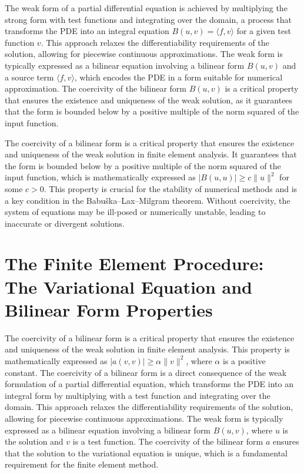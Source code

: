 \documentclass[12pt, a4paper]{article}
\begin{document}
The weak form of a partial differential equation is achieved by multiplying the strong form with test functions and integrating over the domain, a process that transforms the PDE into an integral equation \(B(u, v) = \langle f, v \rangle\) for a given test function \(v\). This approach relaxes the differentiability requirements of the solution, allowing for piecewise continuous approximations. The weak form is typically expressed as a bilinear equation involving a bilinear form \(B(u, v)\) and a source term \(\langle f, v \rangle\), which encodes the PDE in a form suitable for numerical approximation. The coercivity of the bilinear form \(B(u, v)\) is a critical property that ensures the existence and uniqueness of the weak solution, as it guarantees that the form is bounded below by a positive multiple of the norm squared of the input function.

The coercivity of a bilinear form is a critical property that ensures the existence and uniqueness of the weak solution in finite element analysis. It guarantees that the form is bounded below by a positive multiple of the norm squared of the input function, which is mathematically expressed as \(|B(u, u)| \geq c\|u\|^2\) for some \(c > 0\). This property is crucial for the stability of numerical methods and is a key condition in the Babuška–Lax–Milgram theorem. Without coercivity, the system of equations may be ill-posed or numerically unstable, leading to inaccurate or divergent solutions.

\section{The Finite Element Procedure: The Variational Equation and Bilinear Form Properties}
\label{sec:e2697cfa-e3af-46f2-a1f8-6858982e609c}

The coercivity of a bilinear form is a critical property that ensures the existence and uniqueness of the weak solution in finite element analysis. This property is mathematically expressed as \(|a(v, v)| \geq \alpha \|v\|^2\), where \(\alpha\) is a positive constant. The coercivity of a bilinear form is a direct consequence of the weak formulation of a partial differential equation, which transforms the PDE into an integral form by multiplying with a test function and integrating over the domain. This approach relaxes the differentiability requirements of the solution, allowing for piecewise continuous approximations. The weak form is typically expressed as a bilinear equation involving a bilinear form \(B(u, v)\), where \(u\) is the solution and \(v\) is a test function. The coercivity of the bilinear form \(a\) ensures that the solution to the variational equation is unique, which is a fundamental requirement for the finite element method.
\end{document}
